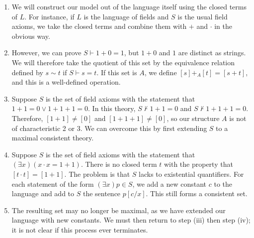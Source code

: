 \begin{enumerate}
    \item We will construct our model out of the language itself using the closed terms of $L$.
    For instance, if $L$ is the language of fields and $S$ is the usual field axioms, we take the closed terms and combine them with $+$ and $\cdot$ in the obvious way.
    \item However, we can prove $S \vdash 1 + 0 = 1$, but $1 + 0$ and $1$ are distinct as strings.
    We will therefore take the quotient of this set by the equivalence relation defined by $s \sim t$ if $S \vdash s = t$.
    If this set is $A$, we define $[s] +_A [t] = [s + t]$, and this is a well-defined operation.
    \item Suppose $S$ is the set of field axioms with the statement that $1 + 1 = 0 \vee 1 + 1 + 1 = 0$.
    In this theory, $S \not\vdash 1 + 1 = 0$ and $S \not\vdash 1 + 1 + 1 = 0$.
    Therefore, $[1+1] \neq [0]$ and $[1+1+1] \neq [0]$, so our structure $A$ is not of characteristic 2 or 3.
    We can overcome this by first extending $S$ to a maximal consistent theory.
    \item Suppose $S$ is the set of field axioms with the statement that $(\exists x)(x \cdot x = 1 + 1)$.
    There is no closed term $t$ with the property that $[t\cdot t] = [1+1]$.
    The problem is that $S$ lacks  to existential quantifiers.
    For each statement of the form $(\exists x)p \in S$, we add a new constant $c$ to the language and add to $S$ the sentence $p[c/x]$.
    This still forms a consistent set.
    \item The resulting set may no longer be maximal, as we have extended our language with new constants.
    We must then return to step (iii) then step (iv); it is not clear if this process ever terminates.
\end{enumerate}

